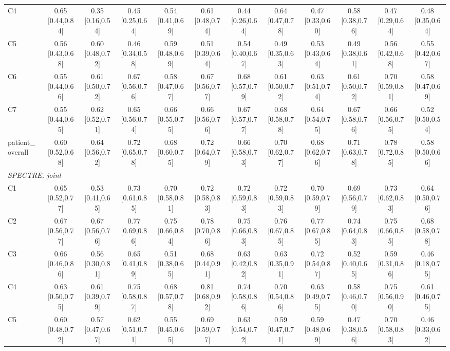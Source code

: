 \begin{tabular}{lccccccccccc}
C4 & 0.65 [0.44,0.84] & 0.35 [0.16,0.54] & 0.45 [0.25,0.64] & 0.54 [0.41,0.69] & 0.61 [0.48,0.74] & 0.44 [0.26,0.64] & 0.64 [0.47,0.78] & 0.47 [0.33,0.60] & 0.58 [0.38,0.76] & 0.47 [0.29,0.64] & 0.48 [0.35,0.64] \\
C5 & 0.56 [0.43,0.68] & 0.60 [0.48,0.72] & 0.46 [0.34,0.58] & 0.59 [0.48,0.69] & 0.51 [0.39,0.64] & 0.54 [0.40,0.67] & 0.49 [0.35,0.63] & 0.53 [0.43,0.64] & 0.49 [0.38,0.61] & 0.56 [0.42,0.68] & 0.55 [0.42,0.67] \\
C6 & 0.55 [0.44,0.66] & 0.61 [0.50,0.72] & 0.67 [0.56,0.76] & 0.58 [0.47,0.67] & 0.67 [0.56,0.77] & 0.68 [0.57,0.79] & 0.61 [0.50,0.72] & 0.63 [0.51,0.74] & 0.61 [0.50,0.72] & 0.70 [0.59,0.81] & 0.58 [0.47,0.69] \\
C7 & 0.55 [0.44,0.65] & 0.62 [0.52,0.71] & 0.65 [0.56,0.74] & 0.66 [0.55,0.75] & 0.66 [0.56,0.76] & 0.67 [0.57,0.77] & 0.68 [0.58,0.78] & 0.64 [0.54,0.75] & 0.67 [0.58,0.76] & 0.66 [0.56,0.75] & 0.52 [0.50,0.54] \\
patient\_overall & 0.60 [0.52,0.68] & 0.64 [0.56,0.72] & 0.72 [0.65,0.78] & 0.68 [0.60,0.75] & 0.72 [0.64,0.79] & 0.66 [0.58,0.73] & 0.70 [0.62,0.77] & 0.68 [0.62,0.76] & 0.71 [0.63,0.78] & 0.78 [0.72,0.85] & 0.58 [0.50,0.66] \\
\multicolumn{12}{l}{\textit{SPECTRE, joint}} \\
C1 & 0.65 [0.52,0.77] & 0.53 [0.41,0.65] & 0.73 [0.61,0.85] & 0.70 [0.58,0.81] & 0.72 [0.58,0.83] & 0.72 [0.59,0.83] & 0.72 [0.59,0.83] & 0.70 [0.59,0.79] & 0.69 [0.56,0.79] & 0.73 [0.62,0.83] & 0.64 [0.50,0.76] \\
C2 & 0.67 [0.56,0.77] & 0.67 [0.56,0.76] & 0.77 [0.69,0.86] & 0.75 [0.66,0.84] & 0.78 [0.70,0.86] & 0.75 [0.66,0.83] & 0.76 [0.67,0.85] & 0.77 [0.67,0.85] & 0.74 [0.64,0.83] & 0.75 [0.66,0.85] & 0.68 [0.58,0.78] \\
C3 & 0.66 [0.46,0.86] & 0.56 [0.30,0.81] & 0.65 [0.41,0.89] & 0.51 [0.38,0.65] & 0.68 [0.44,0.91] & 0.63 [0.42,0.82] & 0.63 [0.35,0.91] & 0.72 [0.54,0.87] & 0.52 [0.40,0.65] & 0.59 [0.31,0.86] & 0.46 [0.18,0.75] \\
C4 & 0.63 [0.50,0.75] & 0.61 [0.39,0.79] & 0.75 [0.58,0.87] & 0.68 [0.57,0.78] & 0.81 [0.68,0.92] & 0.74 [0.58,0.86] & 0.70 [0.54,0.86] & 0.63 [0.49,0.75] & 0.58 [0.46,0.70] & 0.75 [0.56,0.90] & 0.61 [0.46,0.75] \\
C5 & 0.60 [0.48,0.72] & 0.57 [0.47,0.67] & 0.62 [0.51,0.71] & 0.55 [0.45,0.65] & 0.69 [0.59,0.77] & 0.63 [0.54,0.72] & 0.59 [0.47,0.71] & 0.59 [0.48,0.69] & 0.47 [0.38,0.56] & 0.70 [0.58,0.83] & 0.46 [0.33,0.62] \\

\end{tabular}
